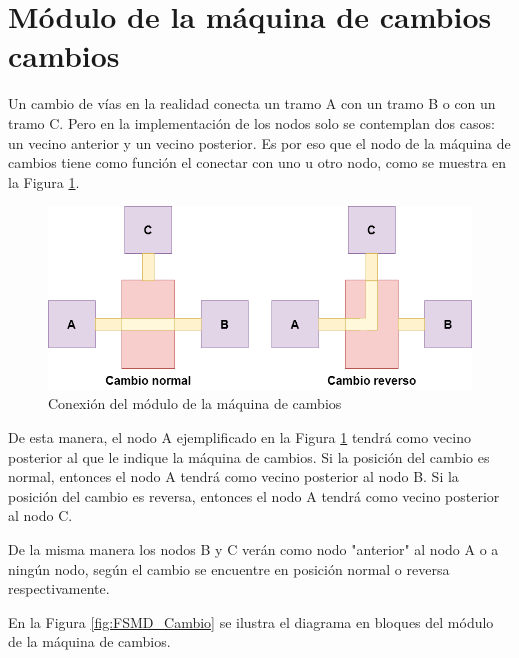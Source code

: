 \section{Módulo de la máquina de cambios cambios}

	Un cambio de vías en la realidad conecta un tramo A con un tramo B o con un tramo C. Pero en la implementación de los nodos solo se contemplan dos casos: un vecino anterior y un vecino posterior. Es por eso que el nodo de la máquina de cambios tiene como función el conectar con uno u otro nodo, como se muestra en la Figura \ref{fig:Cambio_conexion}.
	
	\begin{figure}[h]
	\centering
	\includegraphics[scale=.5]{./Figures/FSMD-Conexiones}
		\caption{Conexión del módulo de la máquina de cambios}
		\label{fig:Cambio_conexion}
	\end{figure}	
	
	De esta manera, el nodo A ejemplificado en la Figura \ref{fig:Cambio_conexion} tendrá como vecino posterior al que le indique la máquina de cambios. Si la posición del cambio es normal, entonces el nodo A tendrá como vecino posterior al nodo B. Si la posición del cambio es reversa, entonces el nodo A tendrá como vecino posterior al nodo C.
	
	De la misma manera los nodos B y C verán como nodo "anterior" al nodo A o a ningún nodo, según el cambio se encuentre en posición normal o reversa respectivamente.	
	
	En la Figura \ref{fig:FSMD_Cambio} se ilustra el diagrama en bloques del módulo de la máquina de cambios.
	
